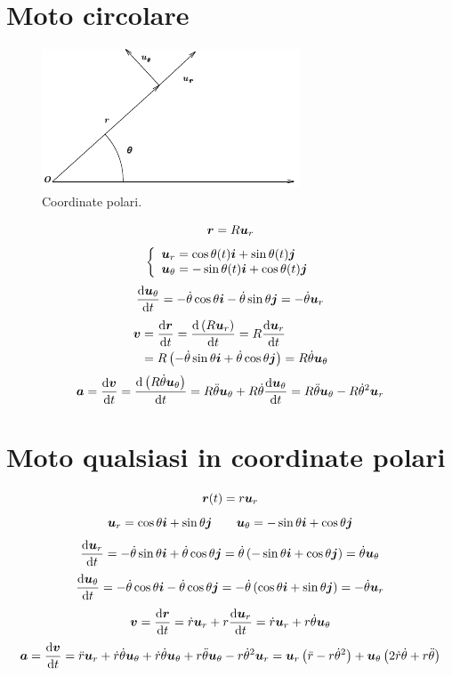 \section{Moto circolare}
\begin{figure}[htbp]
  \centering
  \includegraphics[scale=1]{immagini/fisica1/CorPol}
  \caption{Coordinate polari.}
\end{figure}
\[\boldsymbol{r}=R\boldsymbol{u}_r\]
\[
  \left\{\begin{array}{ll}
    \boldsymbol{u}_r=\cos\theta(t)\boldsymbol{i}+\sin\theta(t)\boldsymbol{j} \\
    \boldsymbol{u}_\theta=-\sin\theta(t)\boldsymbol{i}+\cos\theta(t)\boldsymbol{j}
  \end{array}\right.
\]
\[\frac{\mathrm{d}\boldsymbol{u}_\theta}{\mathrm{d} t}=-\dot{\theta}\cos\theta\boldsymbol{i}-\dot{\theta}\sin\theta\boldsymbol{j}=-\dot{\theta}\boldsymbol{u}_r\]
\begin{align*}
  \boldsymbol{v} & =\frac{\mathrm{d} \boldsymbol{r}}{\mathrm{d} t}=\frac{\mathrm{d}\left(R\boldsymbol{u}_r\right)}{\mathrm{d} t}=R\frac{\mathrm{d} \boldsymbol{u}_r}{\mathrm{d}
  t}                                                                 \\
        & =R\left(-\dot\theta\sin\theta\boldsymbol{i}+\dot\theta\cos\theta\boldsymbol{j}\right)=R\dot\theta\boldsymbol{u}_\theta
\end{align*}
\[\boldsymbol{a}=\frac{\mathrm{d}\boldsymbol{v}}{\mathrm{d} t}=\frac{\mathrm{d}\left(R\dot\theta\boldsymbol{u}_\theta\right)}{\mathrm{d} t}=R\ddot\theta\boldsymbol{u}_\theta+R\dot\theta\frac{\mathrm{d}\boldsymbol{u}_\theta}{\mathrm{d}
    t}=R\ddot\theta\boldsymbol{u}_\theta-R\dot\theta^2\boldsymbol{u}_r\]


\section{Moto qualsiasi in coordinate polari}
\[\boldsymbol{r}(t)=r\boldsymbol{u}_r\]
\[\boldsymbol{u}_r=\cos\theta\boldsymbol{i}+\sin\theta\boldsymbol{j}\qquad \boldsymbol{u}_\theta=-\sin\theta\boldsymbol{i}+\cos\theta\boldsymbol{j}\]
\[\frac{\mathrm{d}\boldsymbol{u}_r}{\mathrm{d} t}=-\dot\theta\sin\theta\boldsymbol{i}+\dot\theta\cos\theta\boldsymbol{j}=\dot\theta\left(-\sin\theta\boldsymbol{i}+\cos\theta\boldsymbol{j}\right)=\dot\theta\boldsymbol{u}_\theta\]
\[\frac{\mathrm{d}\boldsymbol{u}_\theta}{\mathrm{d} t}=-\dot\theta\cos\theta\boldsymbol{i}-\dot\theta\cos\theta\boldsymbol{j}=-\dot\theta\left(\cos\theta\boldsymbol{i}+\sin\theta\boldsymbol{j}\right)=-\dot\theta\boldsymbol{u}_r\]
\[\boldsymbol{v}=\frac{\mathrm{d}\boldsymbol{r}}{\mathrm{d} t}=\dot r\boldsymbol{u}_r+r\frac{\mathrm{d}\boldsymbol{u}_r}{\mathrm{d} t}=\dot r\boldsymbol{u}_r+r\dot\theta\boldsymbol{u}_\theta\]
\[\boldsymbol{a}=\frac{\mathrm{d}\boldsymbol{v}}{\mathrm{d} t}=\ddot r\boldsymbol{u}_r+\dot
  r\dot\theta\boldsymbol{u}_\theta+\dot r\dot\theta\boldsymbol{u}_\theta+r\ddot\theta\boldsymbol{u}_\theta-r\dot\theta^2\boldsymbol{u}_r=\boldsymbol{u}_r\left(\ddot r-r\dot\theta^2\right)+\boldsymbol{u}_\theta\left(2\dot
  r\dot\theta+r\ddot\theta\right)\]


